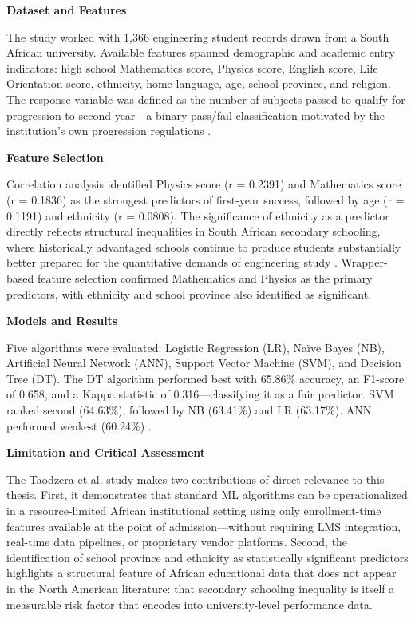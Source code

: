 \documentclass[12pt]{report}
\begin{document}
\textbf{Dataset and Features}

The study worked with 1,366 engineering student records drawn from a South African university. Available features spanned demographic and academic entry indicators: high school Mathematics score, Physics score, English score, Life Orientation score, ethnicity, home language, age, school province, and religion. The response variable was defined as the number of subjects passed to qualify for progression to second year---a binary pass/fail classification motivated by the institution's own progression regulations \parencite{taodzera2016}.

\textbf{Feature Selection}

Correlation analysis identified Physics score (r = 0.2391) and Mathematics score (r = 0.1836) as the strongest predictors of first-year success, followed by age (r = 0.1191) and ethnicity (r = 0.0808). The significance of ethnicity as a predictor directly reflects structural inequalities in South African secondary schooling, where historically advantaged schools continue to produce students substantially better prepared for the quantitative demands of engineering study \parencite{taodzera2016}. Wrapper-based feature selection confirmed Mathematics and Physics as the primary predictors, with ethnicity and school province also identified as significant.

\textbf{Models and Results}

Five algorithms were evaluated: Logistic Regression (LR), Na\"{i}ve Bayes (NB), Artificial Neural Network (ANN), Support Vector Machine (SVM), and Decision Tree (DT). The DT algorithm performed best with 65.86\% accuracy, an F1-score of 0.658, and a Kappa statistic of 0.316---classifying it as a fair predictor. SVM ranked second (64.63\%), followed by NB (63.41\%) and LR (63.17\%). ANN performed weakest (60.24\%) \parencite{taodzera2016}.

\textbf{Limitation and Critical Assessment}

The Taodzera et al. study makes two contributions of direct relevance to this thesis. First, it demonstrates that standard ML algorithms can be operationalized in a resource-limited African institutional setting using only enrollment-time features available at the point of admission---without requiring LMS integration, real-time data pipelines, or proprietary vendor platforms. Second, the identification of school province and ethnicity as statistically significant predictors highlights a structural feature of African educational data that does not appear in the North American literature: that secondary schooling inequality is itself a measurable risk factor that encodes into university-level performance data.
\end{document}
